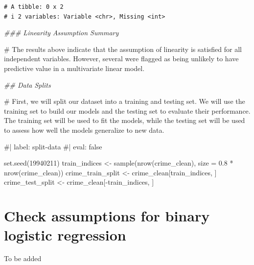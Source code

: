 \documentclass[
  11pt]{article}
\newenvironment{Shaded}{\begin{snugshade}}{\end{snugshade}}
\newcommand{\AttributeTok}[1]{\textcolor[rgb]{0.40,0.45,0.13}{#1}}
\newcommand{\CommentTok}[1]{\textcolor[rgb]{0.37,0.37,0.37}{#1}}
\newcommand{\DecValTok}[1]{\textcolor[rgb]{0.68,0.00,0.00}{#1}}
\newcommand{\DocumentationTok}[1]{\textcolor[rgb]{0.37,0.37,0.37}{\textit{#1}}}
\newcommand{\FloatTok}[1]{\textcolor[rgb]{0.68,0.00,0.00}{#1}}
\newcommand{\FunctionTok}[1]{\textcolor[rgb]{0.28,0.35,0.67}{#1}}
\newcommand{\NormalTok}[1]{\textcolor[rgb]{0.00,0.23,0.31}{#1}}
\newcommand{\OtherTok}[1]{\textcolor[rgb]{0.00,0.23,0.31}{#1}}
\newcommand{\SpecialCharTok}[1]{\textcolor[rgb]{0.37,0.37,0.37}{#1}}
\begin{document}
\begin{verbatim}
# A tibble: 0 x 2
# i 2 variables: Variable <chr>, Missing <int>
\end{verbatim}

\begin{Shaded}
\begin{Highlighting}[]
\DocumentationTok{\#\#\# Linearity Assumption Summary}

\CommentTok{\# The results above indicate that the assumption of linearity is satisfied for all independent variables. However, several were flagged as being unlikely to have predictive value in a multivariate linear model.}

\DocumentationTok{\#\# Data Splits}

\CommentTok{\# First, we will split our dataset into a training and testing set. We will use the training set to build our models and the testing set to evaluate their performance. The training set will be used to fit the models, while the testing set will be used to assess how well the models generalize to new data.}

\CommentTok{\#| label: split{-}data}
\CommentTok{\#| eval: false}

\FunctionTok{set.seed}\NormalTok{(}\DecValTok{19940211}\NormalTok{)}
\NormalTok{train\_indices }\OtherTok{\textless{}{-}} \FunctionTok{sample}\NormalTok{(}\FunctionTok{nrow}\NormalTok{(crime\_clean), }\AttributeTok{size =} \FloatTok{0.8} \SpecialCharTok{*} \FunctionTok{nrow}\NormalTok{(crime\_clean))}
\NormalTok{crime\_train\_split }\OtherTok{\textless{}{-}}\NormalTok{ crime\_clean[train\_indices, ]}
\NormalTok{crime\_test\_split }\OtherTok{\textless{}{-}}\NormalTok{ crime\_clean[}\SpecialCharTok{{-}}\NormalTok{train\_indices, ]}
\end{Highlighting}
\end{Shaded}

\section{Check assumptions for binary logistic
regression}\label{check-assumptions-for-binary-logistic-regression}

\begin{tcolorbox}[enhanced jigsaw, titlerule=0mm, title=\textcolor{quarto-callout-note-color}{\faInfo}\hspace{0.5em}{Note}, toptitle=1mm, colframe=quarto-callout-note-color-frame, colback=white, coltitle=black, opacityback=0, bottomtitle=1mm, opacitybacktitle=0.6, leftrule=.75mm, rightrule=.15mm, colbacktitle=quarto-callout-note-color!10!white, arc=.35mm, toprule=.15mm, left=2mm, breakable, bottomrule=.15mm]

To be added

\end{tcolorbox}
\end{document}
